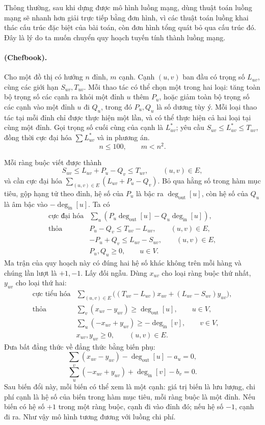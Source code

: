 \documentclass[11pt]{article}
\begin{document}
Thông thường, sau khi dựng được mô hình luồng mạng, dùng thuật toán luồng
mạng sẽ nhanh hơn giải trực tiếp bằng đơn hình, vì các thuật toán luồng khai
thác cấu trúc đặc biệt của bài toán, còn đơn hình tổng quát bỏ qua cấu trúc
đó. Đây là lý do ta muốn chuyển quy hoạch tuyến tính thành luồng mạng.

\paragraph{ (Chefbook).}
Cho một đồ thị có hướng \(n\) đỉnh, \(m\) cạnh. Cạnh \((u,v)\) ban đầu có
trọng số \(L_{uv}\), cùng các giới hạn \(S_{uv},T_{uv}\). Mỗi thao tác có thể
chọn một trong hai loại:
tăng toàn bộ trọng số các cạnh ra khỏi một đỉnh \(u\) thêm \(P_u\), hoặc giảm
toàn bộ trọng số các cạnh vào một đỉnh \(u\) đi \(Q_u\), trong đó \(P_u,Q_u\)
là số dương tùy ý. Mỗi loại thao tác tại mỗi đỉnh chỉ được thực hiện một lần,
và có thể thực hiện cả hai loại tại cùng một đỉnh. Gọi trọng số cuối cùng của
cạnh là \(L^*_{uv}\); yêu cầu \(S_{uv}\le L^*_{uv}\le T_{uv}\), đồng thời cực
đại hóa \(\sum L^*_{uv}\) và in phương án.
\[
  n\le 100,\qquad m<n^2.
\]

Mỗi ràng buộc viết được thành
\[
  S_{uv}\le L_{uv}+P_u-Q_v\le T_{uv},\qquad (u,v)\in E,
\]
và cần cực đại hóa \(\sum_{(u,v)\in E}(L_{uv}+P_u-Q_v)\). Bỏ qua hằng số trong
hàm mục tiêu, gộp hạng tử theo đỉnh, hệ số của \(P_u\) là bậc ra
\(\deg_{\mathrm{out}}[u]\), còn hệ số của \(Q_u\) là âm bậc vào
\(-\deg_{\mathrm{in}}[u]\). Ta có
\[
\begin{array}{ll}
\text{cực đại hóa} &
  \displaystyle \sum_u(P_u\deg_{\mathrm{out}}[u]
  -Q_u\deg_{\mathrm{in}}[u]),\\
\text{thỏa} & P_u-Q_v\le T_{uv}-L_{uv},\qquad (u,v)\in E,\\
& -P_u+Q_v\le L_{uv}-S_{uv},\qquad (u,v)\in E,\\
& P_u,Q_u\ge 0,\qquad u\in V.
\end{array}
\]
Ma trận của quy hoạch này có đúng hai hệ số khác không trên mỗi hàng và chúng
lần lượt là \(+1,-1\). Lấy đối ngẫu. Dùng \(x_{uv}\) cho loại ràng buộc thứ
nhất, \(y_{uv}\) cho loại thứ hai:
\[
\begin{array}{ll}
\text{cực tiểu hóa} &
  \displaystyle \sum_{(u,v)\in E}
  \big((T_{uv}-L_{uv})x_{uv}+(L_{uv}-S_{uv})y_{uv}\big),\\
\text{thỏa} &
  \displaystyle \sum_v(x_{uv}-y_{uv})\ge \deg_{\mathrm{out}}[u],
  \qquad u\in V,\\
& \displaystyle \sum_u(-x_{uv}+y_{uv})\ge -\deg_{\mathrm{in}}[v],
  \qquad v\in V,\\
& x_{uv},y_{uv}\ge 0,\qquad (u,v)\in E.
\end{array}
\]
Đưa bất đẳng thức về đẳng thức bằng biến phụ:
\[
  \sum_v(x_{uv}-y_{uv})-\deg_{\mathrm{out}}[u]-a_u=0,
\]
\[
  \sum_u(-x_{uv}+y_{uv})+\deg_{\mathrm{in}}[v]-b_v=0.
\]
Sau biến đổi này, mỗi biến có thể xem là một cạnh: giá trị biến là lưu lượng,
chi phí cạnh là hệ số của biến trong hàm mục tiêu, mỗi ràng buộc là một đỉnh.
Nếu biến có hệ số \(+1\) trong một ràng buộc, cạnh đi vào đỉnh đó; nếu hệ số
\(-1\), cạnh đi ra. Như vậy mô hình tương đương với luồng chi phí.
\end{document}

